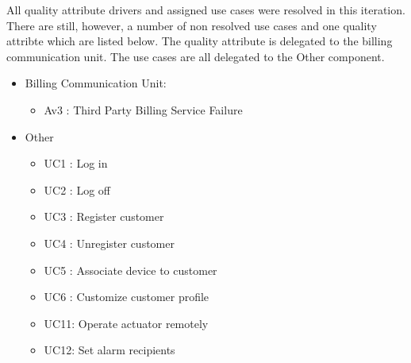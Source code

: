 \npar All quality attribute drivers and assigned use cases were resolved in
this iteration. There are still, however, a number of non resolved use cases and
one quality attribte which are listed below. The quality attribute is
delegated to the billing communication unit. The use cases are all delegated to
the Other component.

\begin{itemize}
  \item Billing Communication Unit:
  \begin{itemize}
    \item Av3 : Third Party Billing Service Failure
  \end{itemize}
  \item Other
  \begin{itemize}
  	\item UC1 : Log in
  	\item UC2 : Log off
  	\item UC3 : Register customer
  	\item UC4 : Unregister customer
  	\item UC5 : Associate device to customer
  	\item UC6 : Customize customer profile
 	\item UC11: Operate actuator remotely
  	\item UC12: Set alarm recipients
  \end{itemize}
\end{itemize}
